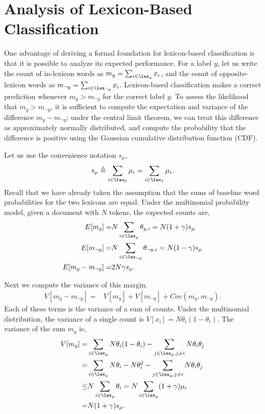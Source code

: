 \section{Analysis of Lexicon-Based Classification}
One advantage of deriving a formal foundation for lexicon-based classification is that it is possible to analyze its expected performance. For a label $y$, let us write the count of in-lexicon words as $m_y = \sum_{i \in \lex_y} x_i$, and the count of opposite-lexicon words as $m_{\neg y} = \sum_{i \in \lex_{\neg y}} x_{i}$. Lexicon-based classification makes a correct prediction whenever $m_y > m_{\neg y}$ for the correct label $y$. To assess the likelihood that $m_y > m_{\neg y}$, it is sufficient to compute the expectation and variance of the difference $m_y - m_{\neg y}$; under the central limit theorem, we can treat this difference as approximately normally distributed, and compute the probability that the difference is positive using the Gaussian cumulative distribution function (CDF).

\newcommand\musum{\ensuremath{s_{\mu}}}
Let us use the convenience notation $\musum$,
\begin{equation}
\musum \triangleq \sum_{i \in \lex_{0}} \mu_i = \sum_{i \in \lex_1}\mu_i.
\end{equation}
Recall that we have already taken the assumption that the sums of baseline word probabilities for the two lexicons are equal. Under the multinomial probability model, given a document with $N$ tokens, the expected counts are,
\begin{align}
E[m_y] = & N \sum_{i \in \lex_{y}}\theta_{y,i} = N(1+\gamma) \musum \\
  E[m_{\neg y}] = & N \sum_{i \in \lex_{\neg y}}\theta_{\neg y,i} = N(1-\gamma) \musum \\
E[m_y - m_{\neg y}] = & 2N\gamma \musum.
\end{align}

Next we compute the variance of this margin,
\begin{align}
V[m_y - m_{\neg y}] = & V[m_y] + V[m_{\neg y}] + Cov(m_y, m_{\neg y}).
\end{align}
Each of these terms is the variance of a sum of counts. Under the multinomial distribution, the variance of a single count is $V[x_i] = N \theta_i (1-\theta_i)$. The variance of the sum $m_y$ is,
\begin{align}
\notag
V[m_y] = & \sum_{i \in \lex_{y}} N \theta_i (1-\theta_i) - \sum_{j \in \lex_{y}, j \neq i} N \theta_i \theta_j\\
= & \sum_{i \in \lex_{y}} N \theta_i - N \theta_i^2 - \sum_{j \in \lex_{y}, j \neq i} N \theta_i \theta_j\\
\notag
\leq & N \sum_{i \in \lex_{y}} \theta_i = N \sum_{i \in \lex_{y}} (1+\gamma)\mu_i\\
= & N(1+\gamma) \musum.
\end{align}

